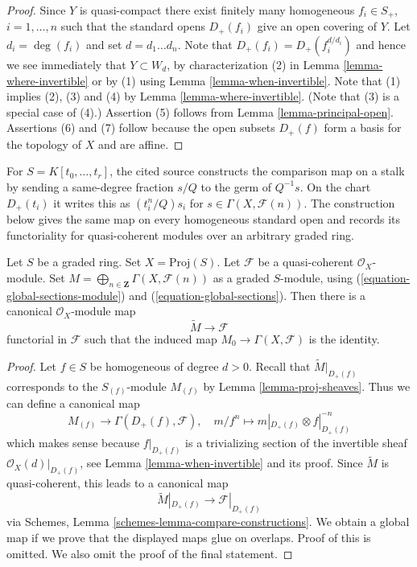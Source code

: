 \begin{proof}
Since $Y$ is quasi-compact there exist finitely many homogeneous
$f_i \in S_{+}$, $i = 1, \ldots, n$ such that the standard opens
$D_{+}(f_i)$ give an open covering of $Y$. Let $d_i = \deg(f_i)$ and set
$d = d_1 \ldots d_n$. Note that $D_{+}(f_i) = D_{+}(f_i^{d/d_i})$
and hence we see immediately that $Y \subset W_d$, by characterization
(2) in Lemma \ref{lemma-where-invertible} or
by (1) using Lemma \ref{lemma-when-invertible}.
Note that (1) implies (2), (3) and (4) by Lemma \ref{lemma-where-invertible}.
(Note that (3) is a special case of (4).)
Assertion (5) follows from Lemma \ref{lemma-principal-open}.
Assertions (6) and (7) follow because the open subsets $D_{+}(f)$
form a basis for the topology of $X$ and are affine.
\end{proof}

\begin{lemma}
\label{lemma-comparison-proj-quasi-coherent}
\begin{reference}
\cite[Chapter III, \S 2, no. 59, definition of $\beta$, p. 252]{FAC}
\end{reference}
\begin{history}
For $S=K[t_0, \ldots, t_r]$, the cited source constructs the comparison
map on a stalk by sending a same-degree fraction $s/Q$ to the germ of
$Q^{-1}s$. On the chart $D_{+}(t_i)$ it writes this as
$(t_i^n/Q)s_i$ for $s \in \Gamma(X, \mathcal{F}(n))$. The construction
below gives the same map on every homogeneous standard open and records
its functoriality for quasi-coherent modules over an arbitrary graded ring.
\end{history}
Let $S$ be a graded ring. Set $X = \text{Proj}(S)$.
Let $\mathcal{F}$ be a quasi-coherent $\mathcal{O}_X$-module.
Set $M = \bigoplus_{n \in \mathbf{Z}} \Gamma(X, \mathcal{F}(n))$ as
a graded $S$-module, using
(\ref{equation-global-sections-module}) and (\ref{equation-global-sections}).
Then there is a canonical $\mathcal{O}_X$-module map
$$
\widetilde{M} \longrightarrow \mathcal{F}
$$
functorial in $\mathcal{F}$ such that the induced map
$M_0 \to \Gamma(X, \mathcal{F})$ is the identity.
\end{lemma}

\begin{proof}
Let $f \in S$ be homogeneous of degree $d > 0$. Recall that
$\widetilde{M}|_{D_{+}(f)}$ corresponds to the
$S_{(f)}$-module $M_{(f)}$ by Lemma \ref{lemma-proj-sheaves}.
Thus we can define a canonical map
$$
M_{(f)} \longrightarrow \Gamma(D_+(f), \mathcal{F}),\quad
m/f^n \longmapsto m|_{D_+(f)} \otimes f|_{D_+(f)}^{-n}
$$
which makes sense because $f|_{D_+(f)}$ is a trivializing
section of the invertible sheaf $\mathcal{O}_X(d)|_{D_+(f)}$, see
Lemma \ref{lemma-when-invertible} and its proof.
Since $\widetilde{M}$ is quasi-coherent, this leads to a canonical
map
$$
\widetilde{M}|_{D_+(f)} \longrightarrow \mathcal{F}|_{D_+(f)}
$$
via Schemes, Lemma \ref{schemes-lemma-compare-constructions}.
We obtain a global map if we prove that the displayed maps glue on overlaps.
Proof of this is omitted. We also omit the proof of the final statement.
\end{proof}

